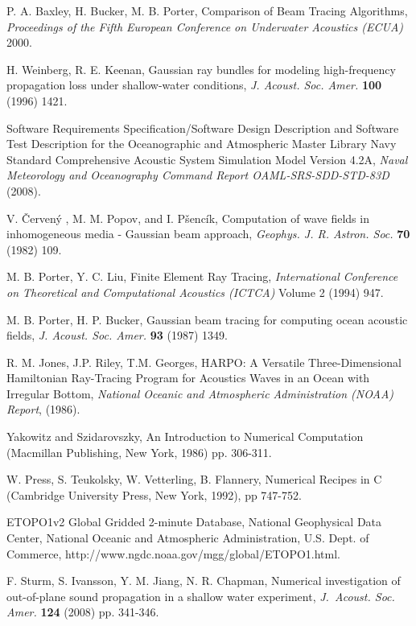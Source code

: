 \documentclass{ws-jca}
\newcommand{\Cerveny}{\v{C}erven\'{y} }
\begin{document}
\begin{thebibliography}{0}
 P. A. Baxley, H. Bucker, M. B. Porter, Comparison of
Beam Tracing Algorithms, {\it Proceedings of the Fifth European Conference
on Underwater Acoustics (ECUA)} {2000}.

 H. Weinberg, R. E. Keenan, Gaussian ray bundles for
modeling high-frequency propagation loss under shallow-water conditions,
{\it J. Acoust. Soc. Amer.} {\bf 100} (1996) 1421.

 Software Requirements Specification/Software Design
Description and Software Test Description for the Oceanographic and
Atmospheric Master Library Navy Standard Comprehensive Acoustic System
Simulation Model Version 4.2A, {\it Naval Meteorology and Oceanography
Command Report OAML-SRS-SDD-STD-83D} (2008).

 V. \Cerveny, M. M. Popov, and I. P\v{s}enc\'{i}k, Computation
of wave fields in inhomogeneous media - Gaussian beam approach, {\it
Geophys. J. R. Astron. Soc.} {\bf 70} (1982) 109.

 M. B. Porter, Y. C. Liu, Finite Element Ray Tracing, 
{\it International Conference on Theoretical and Computational Acoustics (ICTCA)} Volume 2 (1994) 947.

 M. B. Porter, H. P. Bucker, Gaussian beam tracing for
computing ocean acoustic fields, {\it J. Acoust. Soc. Amer.} {\bf 93}
(1987) 1349.

 R. M. Jones, J.P. Riley, T.M. Georges, HARPO: A
Versatile Three-Dimensional Hamiltonian Ray-Tracing Program for Acoustics
Waves in an Ocean with Irregular Bottom, {\it National Oceanic and
Atmospheric Administration (NOAA) Report}, (1986).

 Yakowitz and Szidarovszky, An Introduction to
Numerical Computation (Macmillan Publishing, New York, 1986) pp. 306-311.

 W. Press, S. Teukolsky, W. Vetterling, B. Flannery,
Numerical Recipes in C (Cambridge University Press, New York, 1992), pp
747-752.

 ETOPO1v2 Global Gridded 2-minute Database, National
Geophysical Data Center, National Oceanic and Atmospheric Administration,
U.S. Dept. of Commerce, http://www.ngdc.noaa.gov/mgg/global/ETOPO1.html.

 F. Sturm, S. Ivansson, Y. M. Jiang, N. R. Chapman,
Numerical investigation of out-of-plane sound propagation in a shallow
water experiment, {\it J.~Acoust. Soc. Amer.} {\bf 124} (2008) pp. 341-346.


\end{thebibliography}
\end{document}
